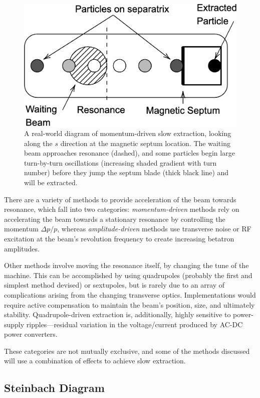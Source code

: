 \documentclass[11pt]{report}
\begin{document}
\begin{figure}
  \centering
  \includegraphics[width=0.6\linewidth]{real-world.png}
  \caption{A real-world diagram of momentum-driven slow extraction, looking along the $s$ direction at the magnetic septum location. The waiting beam approaches resonance (dashed), and some particles begin large turn-by-turn oscillations (increasing shaded gradient with turn number) before they jump the septum blade (thick black line) and will be extracted.}\label{fig:real-world}
\end{figure}

There are a variety of methods to provide acceleration of the beam towards resonance, which fall into two categories: \textit{momentum-driven} methods rely on accelerating the beam towards a stationary resonance by controlling the momentum $\Delta p/p$, whereas \textit{amplitude-driven} methods use transverse noise or RF excitation at the beam's revolution frequency to create increasing betatron amplitudes.

Other methods involve moving the resonance itself, by changing the tune of the machine. This can be accomplished by using quadrupoles (probably the first and simplest method devised) or sextupoles, but is rarely due to an array of complications arising from the changing transverse optics. Implementations would require active compensation to maintain the beam's position, size, and ultimately stability. Quadrupole-driven extraction is, additionally, highly sensitive to power-supply ripples---residual variation in the voltage/current produced by AC-DC power converters. 

These categories are not mutually exclusive, and some of the methods discussed will use a combination of effects to achieve slow extraction.

\subsection{Steinbach Diagram}
\end{document}
